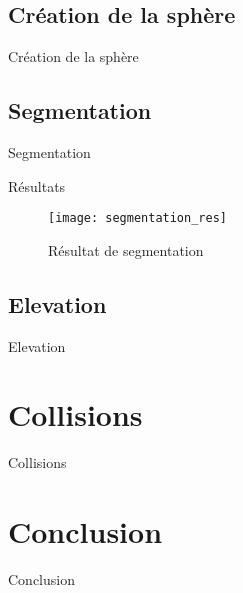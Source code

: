 \documentclass{beamer}
\begin{document}
\subsection{Création de la sphère}
\begin{frame}{Création de la sphère}

\end{frame}

\subsection{Segmentation}
\begin{frame}{Segmentation}

\end{frame}

\begin{frame}{Résultats}

\begin{figure}[H]
        \centering
        \texttt{[image: segmentation\_res]}
        \caption{Résultat de segmentation}
\end{figure}


\end{frame}

\subsection{Elevation}
\begin{frame}{Elevation}

\end{frame}


\section{Collisions}
\begin{frame}{Collisions}

\end{frame}



\section{Conclusion}
\begin{frame}{Conclusion}

\end{frame}
\end{document}
